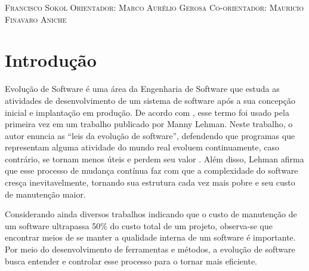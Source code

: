 \documentclass[a4paper, 12pt, twoside]{book}
\begin{document}
\begin{titlepage}
\vspace*{\fill}
\vspace{-5cm}
\vspace{2cm}
\center\textsc{{\Large Francisco Sokol}}
\vspace{1cm}
\center\textsc{{\large Orientador: Marco Aurélio Gerosa}}
\center\textsc{{\large Co-orientador: Mauricio Finavaro Aniche}}
\vfill
\end{titlepage}


\pagestyle{plain}

\setcounter{page}{1}

\tableofcontents

\newpage

\chapter{Introdução}

    Evolução de Software é uma área da Engenharia de Software que estuda as atividades de desenvolvimento de um sistema de software após a sua concepção inicial e implantação em produção. De acordo com \cite{DBLP:series/springer/Mens08}, esse termo foi usado pela primeira vez em um trabalho publicado por Manny Lehman. Neste trabalho, o autor enuncia as ``leis da evolução de software'', defendendo que programas que representam alguma atividade do mundo real evoluem continuamente, caso contrário, se tornam menos úteis e perdem seu valor \cite{Lehman1980b}. Além disso, Lehman afirma que esse processo de mudança contínua faz com que a complexidade do software cresça inevitavelmente, tornando sua estrutura
    cada vez mais pobre e seu custo de manutenção maior.
    
    Considerando ainda diversos trabalhos indicando que o custo de manutenção de um software 
    ultrapassa 50\% do custo total de um projeto, observa-se que encontrar meios de se
    manter a qualidade interna de um software é importante. Por meio do desenvolvimento de
    ferramentas e métodos, a evolução de software busca entender e controlar esse processo
    para o tornar mais eficiente.
    
\end{document}
